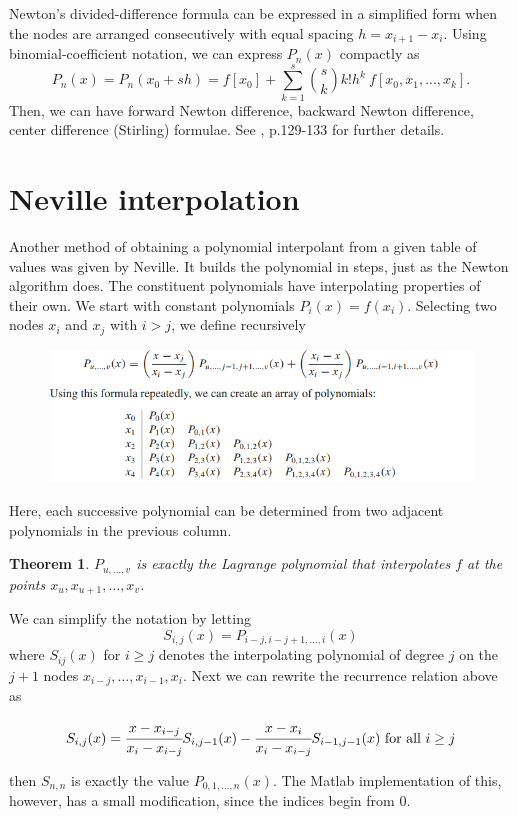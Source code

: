 \documentclass[12pt]{article}
\newtheorem{thm}{Theorem}
\theoremstyle{theorem}
\begin{document}
\begin{shaded}
	
	\vskip -.5cm
	
\end{shaded}

Newton’s divided-difference formula can be expressed in a simplified form when the
nodes are arranged consecutively with equal spacing $h=x_{i+1}-x_i$. Using binomial-coefficient notation, we can express $P_n(x)$ compactly as
%
\[  
P_n(x) = P_n(x_0 + sh) = f [x_0] + \sum_{k=1}^{s} \binom{s}{k} k!h^k \ f[x_0, x_1, . . . , x_k].
\]
%
Then, we can have forward Newton difference, backward Newton difference, center difference (Stirling) formulae. See \cite{BurF10}, p.129-133 for further details.

\section{Neville interpolation}

Another method of obtaining a polynomial interpolant from a given table of values was given by Neville. It builds the polynomial in steps, just as the Newton algorithm does. The constituent polynomials have interpolating properties of their own. We start with constant polynomials $P_i(x) = f(x_i)$. 
Selecting two nodes $x_i$ and $x_j$ with $i>j$, we define recursively
\begin{figure}[h!]
	\centering
	\includegraphics[scale = 0.85]{Figures/27}
\end{figure}
Here, each successive polynomial can be determined from two adjacent polynomials in the previous column. 
%
\begin{thm}
$P_{u,...,v}$ is exactly the Lagrange polynomial that interpolates $f$ at the points $x_u, x_{u+1},\dots,x_v$.
\end{thm}
%
We can simplify the notation by letting
%
\[ S_{i,j}(x) = P_{i-j,i-j+1,\dots,i}(x)  \]
%
where $S_{ij}(x)$ for $i \geq j$ denotes the interpolating polynomial of degree $j$ on the $j + 1$ nodes $x_{i-j}, \dots, x_{i-1}, x_i$. 
Next we can rewrite the recurrence relation above as
%
\begin{shaded}
\[ S_{i,j}(x) = \cfrac{x-x_{i-j}}{x_i-x_{i-j}} S_{i,j-1}(x) -  \cfrac{x-x_i}{x_i-x_{i-j}} S_{i-1,j-1}(x) \mbox{ for all } i\geq j\]
\end{shaded}
%
then $S_{n,n}$ is exactly the value $P_{0,1,\dots,n}(x)$. The Matlab implementation of this, however, has a small modification, since the indices begin from $0$. 
\begin{shaded}
	
\end{shaded}
\end{document}
